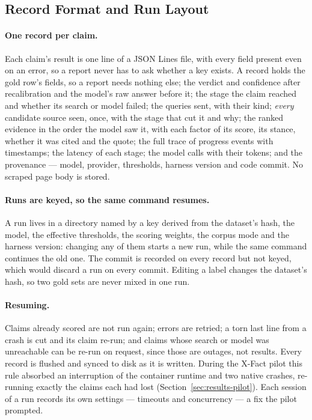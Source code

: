 
\subsection{Record Format and Run Layout}
\label{subsec:harness-records}

\paragraph{One record per claim.} Each claim's result is one line of a
JSON Lines file, with every field present even on an error, so a report
never has to ask whether a key exists. A record holds the gold row's
fields, so a report needs nothing else; the verdict and confidence
after recalibration and the model's raw answer before it; the stage the
claim reached and whether its search or model failed; the queries sent,
with their kind; \emph{every} candidate source seen, once, with the
stage that cut it and why; the ranked evidence in the order the model
saw it, with each factor of its score, its stance, whether it was cited
and the quote; the full trace of progress events with timestamps; the
latency of each stage; the model calls with their tokens; and the
provenance --- model, provider, thresholds, harness version and code
commit. No scraped page body is stored.

\paragraph{Runs are keyed, so the same command resumes.} A run lives in
a directory named by a key derived from the dataset's hash, the model,
the effective thresholds, the scoring weights, the corpus mode and the
harness version: changing any of them starts a new run, while the same
command continues the old one. The commit is recorded on every record
but not keyed, which would discard a run on every commit. Editing a
label changes the dataset's hash, so two gold sets are never mixed in
one run.

\paragraph{Resuming.} Claims already scored are not run again; errors
are retried; a torn last line from a crash is cut and its claim re-run;
and claims whose search or model was unreachable can be re-run on
request, since those are outages, not results. Every record is flushed
and synced to disk as it is written. During the X-Fact pilot this rule
absorbed an interruption of the container runtime and two native
crashes, re-running exactly the claims each had lost
(Section~\ref{sec:results-pilot}). Each session of a run records its
own settings --- timeouts and concurrency --- a fix the pilot prompted.

